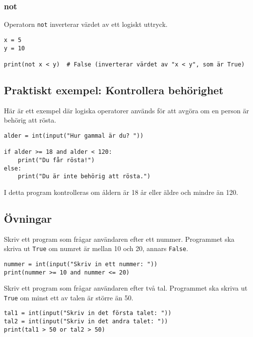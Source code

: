 \subsubsection{\textbf{not}}
Operatorn \texttt{not} inverterar värdet av ett logiskt uttryck.
\begin{lstlisting}[title=Exempel med \texttt{not}]
x = 5
y = 10

print(not x < y)  # False (inverterar värdet av "x < y", som är True)
\end{lstlisting}

\subsection{Praktiskt exempel: Kontrollera behörighet}
Här är ett exempel där logiska operatorer används för att avgöra om en person är behörig att rösta.
\begin{lstlisting}[title=Exempel med behörighetskontroll]
alder = int(input("Hur gammal är du? "))

if alder >= 18 and alder < 120:
    print("Du får rösta!")
else:
    print("Du är inte behörig att rösta.")
\end{lstlisting}

I detta program kontrolleras om åldern är 18 år eller äldre och mindre än 120.

\subsection{Övningar}
\begin{exercise}
Skriv ett program som frågar användaren efter ett nummer. Programmet ska skriva ut \texttt{True} om numret är mellan 10 och 20, annars \texttt{False}.
\end{exercise}

\begin{solution}
\begin{lstlisting}
nummer = int(input("Skriv in ett nummer: "))
print(nummer >= 10 and nummer <= 20)
\end{lstlisting}
\end{solution}

\begin{exercise}
Skriv ett program som frågar användaren efter två tal. Programmet ska skriva ut \texttt{True} om minst ett av talen är större än 50.
\end{exercise}

\begin{solution}
\begin{lstlisting}
tal1 = int(input("Skriv in det första talet: "))
tal2 = int(input("Skriv in det andra talet: "))
print(tal1 > 50 or tal2 > 50)
\end{lstlisting}
\end{solution}


